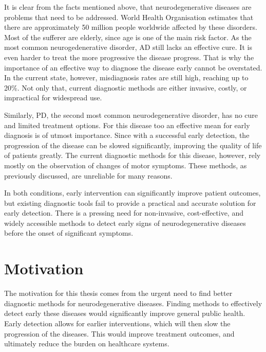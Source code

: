 It is clear from the facts mentioned above, that neurodegenerative diseases are problems that need to be addressed.
World Health Organisation estimates that there are approximately 50 million people worldwide affected by these disorders.
Most of the sufferer are elderly, since age is one of the main risk factor.
As the most common neurogedenerative disorder, \ac{AD} still lacks an effective cure.
It is even harder to treat the more progressive the disease progress.
That is why the importance of an effective way to diagnose the disease early cannot be overstated. 
In the current state, however, misdiagnosis rates are still high, reaching up to 20\%.
Not only that, current diagnostic methods are either invasive, costly, or impractical for widespread use.

Similarly, \ac{PD}, the second most common neurodegenerative disorder, has no cure and limited treatment options. 
For this disease too an effective mean for early diagnosis is of utmost importance.
Since with a successful early detection, the progression of the disease can be slowed significantly, improving the quality of life of patients greatly.
The current diagnostic methods for this disease, however, rely mostly on the observation of changes of motor symptoms.
These methods, as previously discussed, are unreliable for many reasons.

In both conditions, early intervention can significantly improve patient outcomes, but existing diagnostic tools fail to provide a practical and accurate solution for early detection. 
There is a pressing need for non-invasive, cost-effective, and widely accessible methods to detect early signs of neurodegenerative diseases before the onset of significant symptoms.

\section{Motivation}


The motivation for this thesis comes from the urgent need to find better diagnostic methods for neurodegenerative diseases. 
Finding methods to effectively detect early these diseases would significantly improve general public health.
Early detection allows for earlier interventions, which will then slow the progression of the diseases.
This would improve treatment outcomes, and ultimately reduce the burden on healthcare systems.

